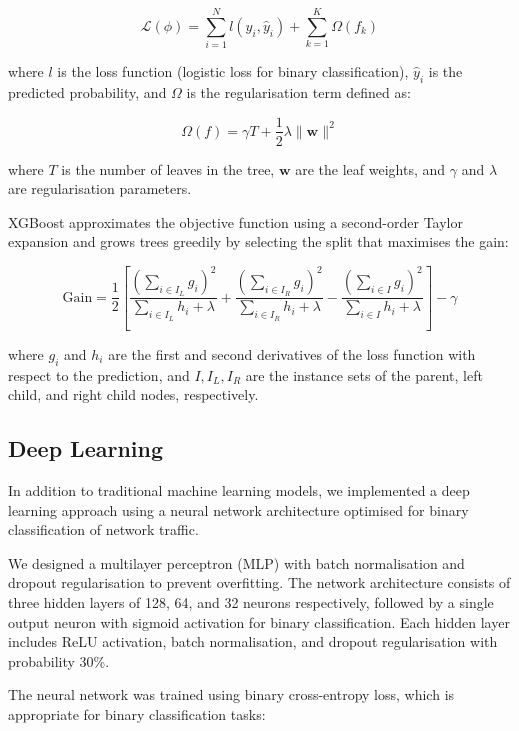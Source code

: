 \begin{equation}
\mathcal{L}(\phi) = \sum_{i=1}^{N} l(y_i, \hat{y}_i) + \sum_{k=1}^{K} \Omega(f_k)
\end{equation}

where $l$ is the loss function (logistic loss for binary classification), $\hat{y}_i$ is the predicted probability, and $\Omega$ is the regularisation term defined as:

\begin{equation}
\Omega(f) = \gamma T + \frac{1}{2}\lambda \|\mathbf{w}\|^2
\end{equation}

where $T$ is the number of leaves in the tree, $\mathbf{w}$ are the leaf weights, and $\gamma$ and $\lambda$ are regularisation parameters.

XGBoost approximates the objective function using a second-order Taylor expansion and grows trees greedily by selecting the split that maximises the gain:

\begin{equation}
\text{Gain} = \frac{1}{2} \left[ \frac{(\sum_{i \in I_L} g_i)^2}{\sum_{i \in I_L} h_i + \lambda} + \frac{(\sum_{i \in I_R} g_i)^2}{\sum_{i \in I_R} h_i + \lambda} - \frac{(\sum_{i \in I} g_i)^2}{\sum_{i \in I} h_i + \lambda} \right] - \gamma
\end{equation}

where $g_i$ and $h_i$ are the first and second derivatives of the loss function with respect to the prediction, and $I, I_L, I_R$ are the instance sets of the parent, left child, and right child nodes, respectively.

\subsection{Deep Learning}

In addition to traditional machine learning models, we implemented a deep learning approach using a neural network architecture optimised for binary classification of network traffic.

We designed a multilayer perceptron (MLP) with batch normalisation and dropout regularisation to prevent overfitting. The network architecture consists of three hidden layers of 128, 64, and 32 neurons respectively, followed by a single output neuron with sigmoid activation for binary classification. Each hidden layer includes ReLU activation, batch normalisation, and dropout regularisation with probability 30\%.

The neural network was trained using binary cross-entropy loss, which is appropriate for binary classification tasks:


